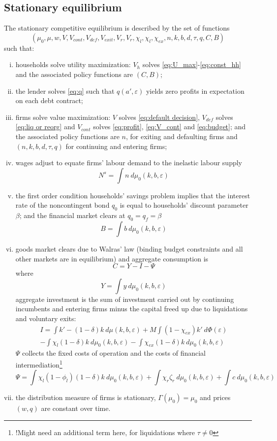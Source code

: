 \documentclass[12pt]{article}
\begin{document}
\subsection{Stationary equilibrium}\label{sec:eq}
The stationary competitive equilibrium is described by the set of functions
$$(\mu_0, \mu, w, V, V_{cont}, V_{def},  V_{exit}, V_r, V_r, \chi_l, \chi_l, \chi_{ex}, n,k,b,d,\tau,q, C, B)$$
such that: 
\begin{enumerate}[(i)]
\item households solve utility maximization: $V_h$ solves \ref{eq:U_max}-\ref{eq:const_hh} and the associated policy functions are $(C, B)$;
\item the lender solves \ref{eq:q} such that $q(a',\varepsilon)$ yields zero profits in expectation on each debt contract;
\item firms solve value maximization: $V$ solves \ref{eq:default decision}, $V_{def}$ solves \ref{eq:liq or reorg} and $V_{cont}$ solves \ref{eq:profit}, \ref{eq:V_cont} and \ref{eq:budget}; and the associated policy functions are $n$, for exiting and defaulting firms and $(n,k,b,d,\tau,q)$ for continuing and entering firms;
\item wages adjust to equate firms' labour demand to the inelastic labour supply
$$ N^s = \int n  \ d \mu_0 (k,b,\varepsilon)  $$
\item the first order condition households' savings problem implies that the interest rate of the noncontingent bond $q_0$ is equal to households' discount parameter $\beta$; and the financial market clears at $q_0 = q_f = \beta$
 $$ B = \int b \ d \mu_0 (k,b,\varepsilon) $$
\item goods market clears due to Walras' law (binding budget constraints and all other markets are in equilibrium) and aggregate consumption is
 $$ C = Y - I - \Psi$$
where
 $$ Y =  \int y \ d \mu_0 (k,b,\varepsilon) $$
aggregate investment is the sum of investment carried out by continuing incumbents and entering firms minus the capital freed up due to liquidations and voluntary exits:
\begin{multline*} 
    I = \int   k' -(1-\delta)k \ d \mu (k,b,\varepsilon) + M \int (1-\chi_{ex}) k' \ d \Phi(\varepsilon)    \\
   -  \int  \chi_l (1-\delta)k \ d \mu_0 (k,b,\varepsilon) - \int \chi_{ex} (1-\delta) k \ d \mu_0 (k,b,\varepsilon)   
\end{multline*}
$\Psi$ collects the fixed costs of operation and the costs of financial intermediation\footnote{!Might need an additional term here, for liquidations where $\tau \neq 0$}
$$ \Psi = \int  \chi_l (1-\phi_l) (1-\delta)k \ d \mu_0 (k,b,\varepsilon) + \int  \chi_r \zeta_r \ d \mu_0 (k,b,\varepsilon) + \int  c \ d \mu_0 (k,b,\varepsilon) $$
\item the distribution measure of firms is stationary, $\Gamma(\mu_0) = \mu_0$ and prices $(w,q)$ are constant over time.
\end{enumerate}
\end{document}
